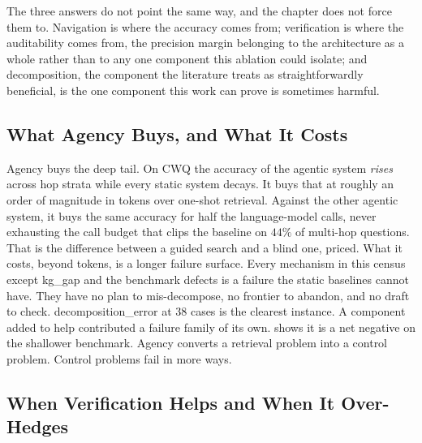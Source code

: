 The three answers do not point the same way, and the chapter does not force them
to. Navigation is where the accuracy comes from; verification is where the
auditability comes from, the precision margin belonging to the architecture as a
whole rather than to any one component this ablation could isolate; and
decomposition, the component the literature treats as straightforwardly
beneficial, is the one component this work can prove is sometimes harmful.

\subsection{What Agency Buys, and What It Costs}

Agency buys the deep tail. On CWQ the accuracy of the agentic system
\emph{rises} across hop strata while every static system decays. It buys that at
roughly an order of magnitude in tokens over one-shot retrieval. Against the
other agentic system, it buys the same accuracy for half the language-model
calls, never exhausting the call budget that clips the baseline on $44\%$ of
multi-hop questions. That is the difference between a guided search and a blind
one, priced. What it costs, beyond tokens, is a longer failure surface. Every
mechanism in this census except \textsf{kg\_gap} and the benchmark defects is a
failure the static baselines cannot have. They have no plan to mis-decompose, no
frontier to abandon, and no draft to check. \textsf{decomposition\_error} at
$38$ cases is the clearest instance. A component added to help contributed a
failure family of its own.  shows it is a net negative on
the shallower benchmark. Agency converts a retrieval problem into a control
problem. Control problems fail in more ways.

\subsection{When Verification Helps and When It
Over-Hedges}\label{sec:verification-tradeoff}

